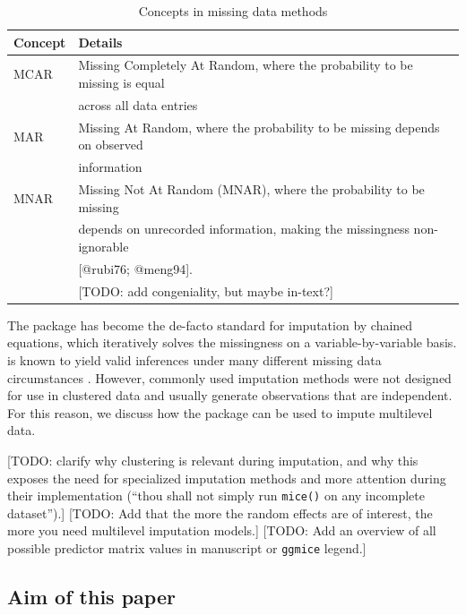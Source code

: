 \documentclass[
]{jss}
\begin{document}
\begin{table}[tb]
\caption{Concepts in missing data methods}
\label{tab:miss}
\centering
\begin{tabular}{ll}
\hline
\textbf{Concept} & \textbf{Details}   \\
\hline
MCAR    & Missing Completely At Random, where the probability to be missing is equal \\
& across all data entries \\
MAR     & Missing At Random, where the probability to be missing depends on observed \\
& information \\
MNAR    & Missing Not At Random (MNAR), where the probability to be missing \\
& depends on unrecorded information, making the missingness non-ignorable \\
& [@rubi76; @meng94]. \\
& [TODO: add congeniality, but maybe in-text?] \\
\hline
\end{tabular}
\end{table}

The  package  has become the de-facto standard for
imputation by chained equations, which iteratively solves the
missingness on a variable-by-variable basis.  is known to
yield valid inferences under many different missing data circumstances
\citep{buur18}. However, commonly used imputation methods were not
designed for use in clustered data and usually generate observations
that are independent. For this reason, we discuss how the 
package  can be used to impute multilevel data.

{[}TODO: clarify why clustering is relevant during imputation, and why
this exposes the need for specialized imputation methods and more
attention during their implementation (``thou shall not simply run
\texttt{mice()} on any incomplete dataset'').{]} {[}TODO: Add that the
more the random effects are of interest, the more you need multilevel
imputation models.{]} {[}TODO: Add an overview of all possible predictor
matrix values in manuscript or \texttt{ggmice} legend.{]}

\hypertarget{aim-of-this-paper}{%
\subsection{Aim of this paper}\label{aim-of-this-paper}}
\end{document}
